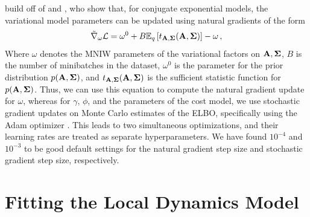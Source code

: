 \citet{svae} build off of \citet{svi} and \citet{vmp}, who show that, for conjugate exponential models, the variational model parameters can be updated using natural gradients of the form
\begin{equation}
    \tilde{\nabla}_{\omega}\mathcal{L}=\omega^0+B\mathbb{E}_q\left[t_{\mathbf{A},\bm{\Sigma}}(\mathbf{A},\bm{\Sigma})\right]-\omega\,,
\end{equation}
Where $\omega$ denotes the MNIW parameters of the variational factors on $\mathbf{A},\bm{\Sigma}$, $B$ is the number of minibatches in the dataset, $\omega^0$ is the parameter for the prior distribution $p(\mathbf{A},\bm{\Sigma})$, and $t_{\mathbf{A},\bm{\Sigma}}(\mathbf{A},\bm{\Sigma})$ is the sufficient statistic function for $p(\mathbf{A},\bm{\Sigma})$. Thus, we can use this equation to compute the natural gradient update for $\omega$, whereas for $\gamma$, $\phi$, and the parameters of the cost model, we use stochastic gradient updates on Monte Carlo estimates of the ELBO, specifically using the Adam optimizer \citep{adam}. This leads to two simultaneous optimizations, and their learning rates are treated as separate hyperparameters. We have found $10^{-4}$ and $10^{-3}$ to be good default settings for the natural gradient step size and stochastic gradient step size, respectively.


\section{Fitting the Local Dynamics Model}
\label{sec:supp-fit}

